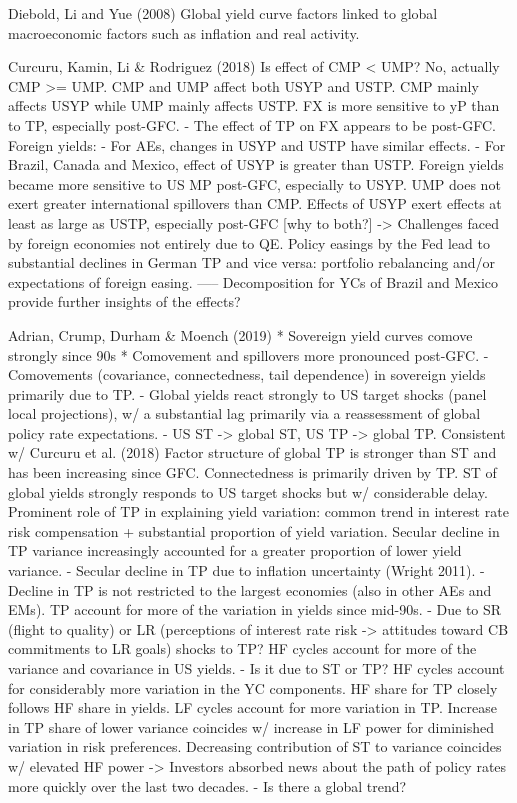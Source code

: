Diebold, Li and Yue (2008)
Global yield curve factors linked to global macroeconomic factors such as inflation and real activity.

Curcuru, Kamin, Li \& Rodriguez (2018)
Is effect of CMP < UMP? No, actually CMP >= UMP.
CMP and UMP affect both USYP and USTP.
CMP mainly affects USYP while UMP mainly affects USTP.
FX is more sensitive to yP than to TP, especially post-GFC.
- The effect of TP on FX appears to be post-GFC.
Foreign yields:
- For AEs, changes in USYP and USTP have similar effects.
- For Brazil, Canada and Mexico, effect of USYP is greater than USTP.
Foreign yields became more sensitive to US MP post-GFC, especially to USYP.
UMP does not exert greater international spillovers than CMP.
Effects of USYP exert effects at least as large as USTP, especially post-GFC [why to both?] -> Challenges faced by foreign economies not entirely due to QE.
Policy easings by the Fed lead to substantial declines in German TP and vice versa: portfolio rebalancing and/or expectations of foreign easing.
-----
Decomposition for YCs of Brazil and Mexico provide further insights of the effects?


Adrian, Crump, Durham \& Moench (2019)
* Sovereign yield curves comove strongly since 90s
* Comovement and spillovers more pronounced post-GFC.
- Comovements (covariance, connectedness, tail dependence) in sovereign yields primarily due to TP.
- Global yields react strongly to US target shocks (panel local projections), w/ a substantial lag primarily via a reassessment of global policy rate expectations.
- US ST -> global ST, US TP -> global TP. Consistent w/ Curcuru et al. (2018)
Factor structure of global TP is stronger than ST and has been increasing since GFC.
Connectedness is primarily driven by TP.
ST of global yields strongly responds to US target shocks but w/ considerable delay.
Prominent role of TP in explaining yield variation: common trend in interest rate risk compensation + substantial proportion of yield variation.
Secular decline in TP variance increasingly accounted for a greater proportion of lower yield variance.
- Secular decline in TP due to inflation uncertainty (Wright 2011).
- Decline in TP is not restricted to the largest economies (also in other AEs and EMs).
TP account for more of the variation in yields since mid-90s.
- Due to SR (flight to quality) or LR (perceptions of interest rate risk -> attitudes toward CB commitments to LR goals) shocks to TP?
HF cycles account for more of the variance and covariance in US yields.
- Is it due to ST or TP? HF cycles account for considerably more variation in the YC components. HF share for TP closely follows HF share in yields. LF cycles account for more variation in TP. 
Increase in TP share of lower variance coincides w/ increase in LF power for diminished variation in risk preferences.
Decreasing contribution of ST to variance coincides w/ elevated HF power -> Investors absorbed news about the path of policy rates more quickly over the last two decades.
- Is there a global trend?


